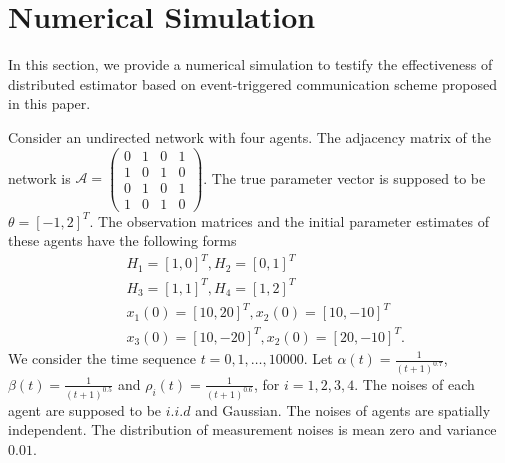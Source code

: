 \documentclass[10pt,journal,final]{IEEEtran}
\newcommand{\norm}[1]{\left\lVert#1\right\rVert}
\theoremstyle{plain}
\newtheorem{theorem}{Theorem}[section]
\theoremstyle{definition}
\theoremstyle{remark}
\begin{document}
%
%
%

\section{Numerical Simulation}
In this section, we provide a numerical simulation to testify the effectiveness of distributed estimator based on event-triggered communication scheme proposed in this paper.

Consider an undirected network with four agents. The adjacency matrix of the network is $\mathcal{A}=\left(\begin{smallmatrix}
0& 1&0&1\\
1& 0&1&0\\
0& 1&0&1\\
1& 0&1&0
\end{smallmatrix}\right)$.
 The true parameter vector is supposed to be $\theta=[-1,2]^T.$ The observation matrices and the initial parameter estimates of these agents have the following forms
\begin{align*}
&H_1=[1,0]^T, H_2=[0,1]^T\\
&H_3=[1,1]^T, H_4=[1,2]^T\\
&x_{1}(0)=[10,20]^T,x_{2}(0)=[10,-10]^T\\
&x_{3}(0)=[10,-20]^T,x_{2}(0)=[20,-10]^T.
\end{align*}
We consider the time sequence $t=0,1,\dots,10000$. Let $\alpha(t)=\frac{1}{(t+1)^{0.7}}$, $\beta(t)=\frac{1}{(t+1)^{0.5}}$ and $\rho_{i}(t)=\frac{1}{(t+1)^{0.6}}$, for $i=1,2,3,4.$ The noises of each agent are supposed to be $i.i.d$ and Gaussian. The noises of agents are spatially independent. The distribution of measurement noises is mean zero and variance $0.01$. 
\end{document}
